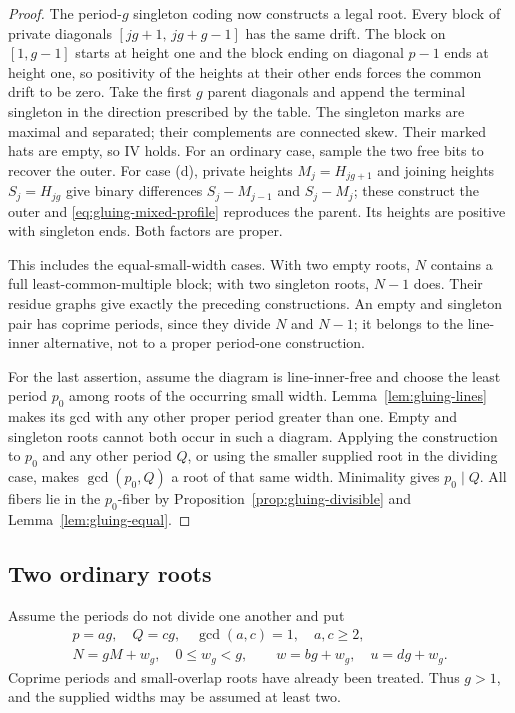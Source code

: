 \documentclass[11pt,a4paper]{amsart}
\numberwithin{equation}{section}
\theoremstyle{plain}
\theoremstyle{definition}
\begin{document}
\begin{proof}
The period-\(g\) singleton coding now constructs a legal root.  Every block of private diagonals \([jg+1,\,jg+g-1]\) has the same drift.  The block on \([1,g-1]\) starts at height one and the block ending on diagonal \(p-1\) ends at height one, so positivity of the heights at their other ends forces the common drift to be zero.  Take the first \(g\) parent diagonals and append the terminal singleton in the direction prescribed by the table.  The singleton marks are maximal and separated; their complements are connected skew.  Their marked hats are empty, so IV holds.  For an ordinary case, sample the two free bits to recover the outer.  For case (d), private heights \(M_j=H_{jg+1}\) and joining heights \(S_j=H_{jg}\) give binary differences \(S_j-M_{j-1}\) and \(S_j-M_j\); these construct the outer and \eqref{eq:gluing-mixed-profile} reproduces the parent.  Its heights are positive with singleton ends.  Both factors are proper.

This includes the equal-small-width cases.  With two empty roots, \(N\) contains a full least-common-multiple block; with two singleton roots, \(N-1\) does.  Their residue graphs give exactly the preceding constructions.  An empty and singleton pair has coprime periods, since they divide \(N\) and \(N-1\); it belongs to the line-inner alternative, not to a proper period-one construction.

For the last assertion, assume the diagram is line-inner-free and choose the least period \(p_0\) among roots of the occurring small width.  Lemma~\ref{lem:gluing-lines} makes its gcd with any other proper period greater than one.  Empty and singleton roots cannot both occur in such a diagram.  Applying the construction to \(p_0\) and any other period \(Q\), or using the smaller supplied root in the dividing case, makes \(\gcd(p_0,Q)\) a root of that same width.  Minimality gives \(p_0\mid Q\).  All fibers lie in the \(p_0\)-fiber by Proposition~\ref{prop:gluing-divisible} and Lemma~\ref{lem:gluing-equal}.
\end{proof}

\subsection{Two ordinary roots}

Assume the periods do not divide one another and put
\begin{equation}\label{eq:gluing-gcd-data}
 \begin{gathered}
 p=ag,\quad Q=cg,\quad\gcd(a,c)=1,\quad a,c\ge2,\\
 N=gM+w_g,\quad0\le w_g<g,\qquad w=bg+w_g,\quad u=dg+w_g.
 \end{gathered}
\end{equation}
Coprime periods and small-overlap roots have already been treated.  Thus \(g>1\), and the supplied widths may be assumed at least two.
\end{document}

